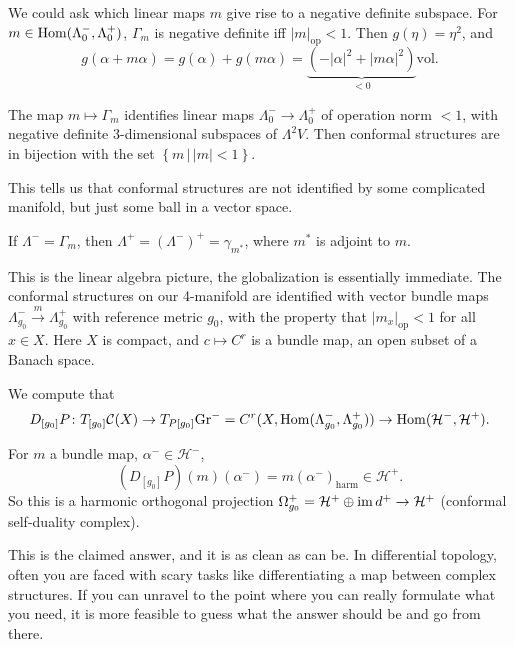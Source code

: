 We could ask which linear maps $m$ give rise to a negative definite subspace. For $m \in \operatorname{Hom} (\Lambda_0^-, \Lambda_0^+)$, $\Gamma_m$ is negative definite iff $|m| _{\mathrm{op}}<1$. Then $g(\eta) = \eta ^2$, and 
\[
    g(\alpha  + m\alpha  ) = g(\alpha ) + g(m\alpha ) = \underset{<0}{\underbrace{\left( -|\alpha |^2 + |m\alpha |^2 \right)}}  \mathrm{vol}.
\] 
\begin{prop}
    The map $m \mapsto \Gamma_m$ identifies linear maps $\Lambda_0^- \to \Lambda_0^+$ of operation norm $<1$, with negative definite 3-dimensional subspaces of $\Lambda^2V$. Then conformal structures are in bijection with the set $\left\{m \,\big|\, |m| < 1\right\} $.
\end{prop}
This tells us that conformal structures are not identified by some complicated manifold, but just some ball in a vector space.
\begin{remark}
    If $\Lambda^- = \Gamma_m$, then $\Lambda^+ = (\Lambda^-) ^+ = \gamma _{m^*}$, where $m^*$ is adjoint to $m$.
\end{remark}
This is the linear algebra picture, the globalization is essentially immediate. The conformal structures on our 4-manifold are identified with vector bundle maps $\Lambda_{g_0} ^- \xrightarrow{m}  \Lambda_{g_0} ^+$ with reference metric $g_0$, with the property that $|m_x| _{\mathrm{op}}<1$ for all $x \in X$. Here $X$ is compact, and $c \mapsto  C^r$ is a bundle map, an open subset of a Banach space.

We compute that \[
    D_{[g_0]}P \colon T_{[g_0]}\mathcal C(X) \to  T_{P[g_0]}\mathrm{Gr}^- = C^r(X, \operatorname{Hom}(\Lambda_{g_0}^-, \Lambda_{g_0}^+)) \to \operatorname{Hom} (\mathcal H^-, \mathcal H^+).
\] 
\begin{prop}
    For $m$ a bundle map, $\alpha ^- \in \mathcal H^-$, \[
        (D_{[g_0]}P)(m) (\alpha ^-) = m(\alpha ^-)_{\mathrm{harm} } \in \mathcal H^+.
    \] So this is a harmonic orthogonal projection $\Omega_{g_0}^+ = \mathcal H^+ \oplus \operatorname{im} d^+\to \mathcal H^+$ (conformal self-duality complex).
\end{prop}
This is the claimed answer, and it is as clean as can be. In differential topology, often you are faced with scary tasks like differentiating a map between complex structures. If you can unravel to the point where you can really formulate what you need, it is more feasible to guess what the answer should be and go from there.

